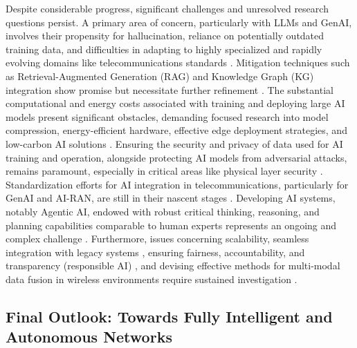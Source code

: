 \documentclass[sigconf]{acmart}
\begin{document}
Despite considerable progress, significant challenges and unresolved research questions persist. A primary area of concern, particularly with LLMs and GenAI, involves their propensity for hallucination, reliance on potentially outdated training data, and difficulties in adapting to highly specialized and rapidly evolving domains like telecommunications standards \cite{ref4, ref7, ref9, ref18, ref26}. Mitigation techniques such as Retrieval-Augmented Generation (RAG) and Knowledge Graph (KG) integration show promise but necessitate further refinement \cite{ref4, ref7}. The substantial computational and energy costs associated with training and deploying large AI models present significant obstacles, demanding focused research into model compression, energy-efficient hardware, effective edge deployment strategies, and low-carbon AI solutions \cite{ref3, ref9, ref13, ref14, ref29, ref31}. Ensuring the security and privacy of data used for AI training and operation, alongside protecting AI models from adversarial attacks, remains paramount, especially in critical areas like physical layer security \cite{ref5, ref16, ref30}. Standardization efforts for AI integration in telecommunications, particularly for GenAI and AI-RAN, are still in their nascent stages \cite{ref2, ref18, ref25}. Developing AI systems, notably Agentic AI, endowed with robust critical thinking, reasoning, and planning capabilities comparable to human experts represents an ongoing and complex challenge \cite{ref9, ref35}. Furthermore, issues concerning scalability, seamless integration with legacy systems \cite{ref10}, ensuring fairness, accountability, and transparency (responsible AI) \cite{ref21}, and devising effective methods for multi-modal data fusion in wireless environments \cite{ref18} require sustained investigation \cite{ref6, ref8, ref12, ref15, ref17, ref20, ref22, ref23, ref24, ref31, ref32, ref34}.

\subsection{Final Outlook: Towards Fully Intelligent and Autonomous Networks}
\label{subsec:final_outlook}
\end{document}
